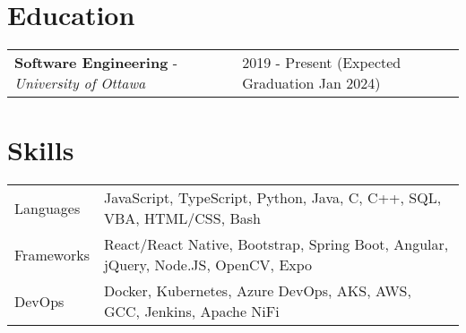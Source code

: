\documentclass[a4paper,11pt]{article}
\begin{document}
\section{Education}
\begin{tabularx}{\linewidth}{@{}l X@{}}	
\textbf{Software Engineering} - \textit{University of Ottawa} & \hfill 2019 - Present (Expected Graduation Jan 2024) \\[3.75pt]
\end{tabularx}

\section{Skills}
\begin{tabularx}{\linewidth}{@{}l X@{}}
Languages &  \normalsize{JavaScript, TypeScript, Python, Java, C, C++, SQL, VBA, HTML/CSS, Bash}\\
Frameworks  &  \normalsize{React/React Native, Bootstrap, Spring Boot, Angular, jQuery, Node.JS, OpenCV, Expo}\\ 
DevOps  &  \normalsize{Docker, Kubernetes, Azure DevOps, AKS, AWS, GCC, Jenkins, Apache NiFi}\\
\end{tabularx}
\vfill
\end{document}
